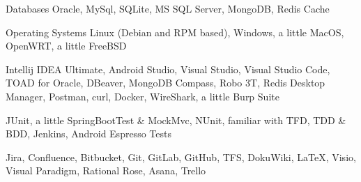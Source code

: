\begin{cvskills}
\cvskill
  {Databases} %
  {Oracle, MySql, SQLite, MS SQL Server, MongoDB, Redis Cache} %
  
\cvskill
  {Operating Systems} %
  {Linux (Debian and RPM based), Windows, a little MacOS, OpenWRT, a little FreeBSD} %
  
\cvskill
  {} %
  {Intellij IDEA Ultimate, Android Studio, Visual Studio, Visual Studio Code, TOAD for Oracle, DBeaver, MongoDB Compass, Robo 3T, Redis Desktop Manager, Postman, curl, Docker, WireShark, a little Burp Suite} %
  
\cvskill
  {} %
  {JUnit, a little SpringBootTest \& MockMvc, NUnit, familiar with TFD, TDD \& BDD, Jenkins, Android Espresso Tests} %
  
\cvskill
  {} %
  {Jira, Confluence, Bitbucket, Git, GitLab, GitHub, TFS, DokuWiki, LaTeX, Visio, Visual Paradigm, Rational Rose, Asana, Trello} %
  
\end{cvskills}
